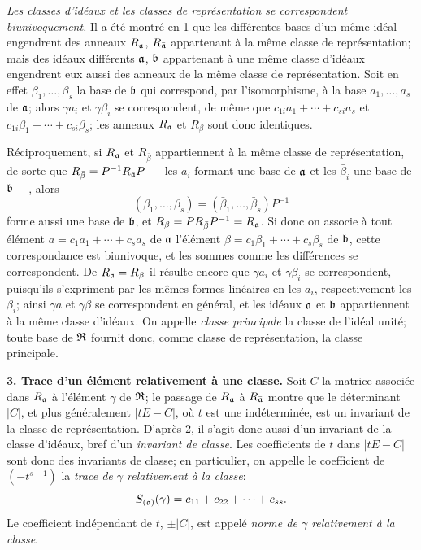 \emph{Les classes d'idéaux et les classes de représentation se correspondent biunivoquement.} Il a été montré en 1 que les différentes bases d'un même idéal engendrent des anneaux $R_\mathfrak a$, $R_{\bar{\mathfrak a}}$ appartenant à la même classe de représentation; mais des idéaux différents $\mathfrak a$, $\mathfrak b$ appartenant à une même classe d'idéaux engendrent eux aussi des anneaux de la même classe de représentation. Soit en effet $\beta_1,\ldots,\beta_s$ la base de $\mathfrak b$ qui correspond, par l'isomorphisme, à la base $a_1,\ldots,a_s$ de $\mathfrak a$; alors $\gamma a_i$ et $\gamma\beta_i$ se correspondent, de même que $c_{1i}a_1+\cdots+c_{si}a_s$ et $c_{1i}\beta_1+\cdots+c_{si}\beta_s$; les anneaux $R_\mathfrak a$ et $R_\beta$ sont donc identiques.

Réciproquement, si $R_\mathfrak a$ et $R_{\bar\beta}$ appartiennent à la même classe de représentation, de sorte que $R_{\bar\beta}=P^{-1}R_\mathfrak a P$ --- les $a_i$ formant une base de $\mathfrak a$ et les $\bar\beta_i$ une base de $\mathfrak b$ ---, alors
\[
(\beta_1,\ldots,\beta_s)=(\bar\beta_1,\ldots,\bar\beta_s)P^{-1}
\]
forme aussi une base de $\mathfrak b$, et $R_\beta=PR_{\bar\beta}P^{-1}=R_\mathfrak a$. Si donc on associe à tout élément $a=c_1a_1+\cdots+c_sa_s$ de $\mathfrak a$ l'élément $\beta=c_1\beta_1+\cdots+c_s\beta_s$ de $\mathfrak b$, cette correspondance est biunivoque, et les sommes comme les différences se correspondent. De $R_\mathfrak a=R_\beta$ il résulte encore que $\gamma a_i$ et $\gamma\beta_i$ se correspondent, puisqu'ils s'expriment par les mêmes formes linéaires en les $a_i$, respectivement les $\beta_i$; ainsi $\gamma a$ et $\gamma\beta$ se correspondent en général, et les idéaux $\mathfrak a$ et $\mathfrak b$ appartiennent à la même classe d'idéaux. On appelle \emph{classe principale} la classe de l'idéal unité; toute base de $\mathfrak R$ fournit donc, comme classe de représentation, la classe principale.

\textbf{3. Trace d'un élément relativement à une classe.} Soit $C$ la matrice associée dans $R_\mathfrak a$ à l'élément $\gamma$ de $\mathfrak R$; le passage de $R_\mathfrak a$ à $R_{\bar{\mathfrak a}}$ montre que le déterminant $|C|$, et plus généralement $|tE-C|$, où $t$ est une indéterminée, est un invariant de la classe de représentation. D'après 2, il s'agit donc aussi d'un invariant de la classe d'idéaux, bref d'un \emph{invariant de classe}. Les coefficients de $t$ dans $|tE-C|$ sont donc des invariants de classe; en particulier, on appelle le coefficient de $(-t^{s-1})$ la \emph{trace de $\gamma$ relativement à la classe}:
\[
S_{(\mathfrak a)}(\gamma)=c_{11}+c_{22}+\cdots+c_{ss}.
\]
Le coefficient indépendant de $t$, $\pm|C|$, est appelé \emph{norme de $\gamma$ relativement à la classe}.

